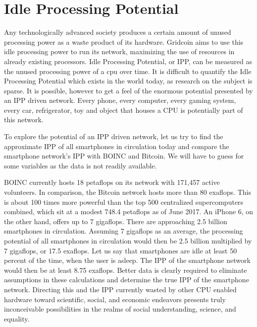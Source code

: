 \section{Idle Processing Potential}

\label{sec:IPP}

Any technologically advanced society produces a certain amount of unused processing power as a waste product of its hardware.  Gridcoin aims to use this idle processing power to run its network, maximizing the use of resources in already existing processors.  Idle Processing Potential, or IPP, can be measured as the unused processing power of a cpu over time.  It is difficult to quantify the Idle Processing Potential which exists in the world today, as research on the subject is sparse.  It is possible, however to get a feel of the enormous potential presented by an IPP driven network.  Every phone, every computer, every gaming system, every car, refrigerator, toy and object that houses a CPU is potentially part of this network. 
 
To explore the potential of an IPP driven network, let us try to find the approximate IPP of all smartphones in circulation today and compare the smartphone network’s IPP with BOINC and Bitcoin.  We will have to guess for some variables as the data is not readily available.

BOINC currently hosts 18 petaflops on its network with 171,457 active volunteers.  In comparison, the Bitcoin network hosts more than 80 exaflops.  This is about 100 times more powerful than the top 500 centralized supercomputers combined, which sit at a modest 748.4 petaflops as of June 2017.  An iPhone 6, on the other hand, offers up to 7 gigaflops.  There are approaching 2.5 billion smartphones in circulation.  Assuming 7 gigaflops as an average, the processing potential of all smartphones in circulation would then be 2.5 billion multiplied by 7 gigaflops, or 17.5 exaflops.  Let us say that smartphones are idle at least 50 percent of the time, when the user is asleep.  The IPP of the smartphone network would then be at least 8.75 exaflops.  Better data is clearly required to eliminate assumptions in these calculations and determine the true IPP of the smartphone network.  Directing this and the IPP currently wasted by other CPU enabled hardware toward scientific, social, and economic endeavors presents truly inconceivable possibilities in the realms of social understanding, science, and equality. 